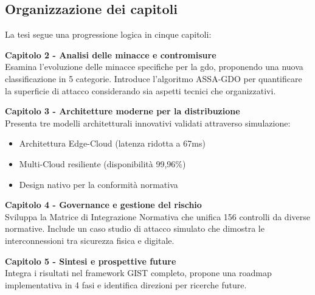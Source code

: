 \subsection{Organizzazione dei capitoli}
\label{subsec:organizzazione}

La tesi segue una progressione logica in cinque capitoli:

\textbf{Capitolo 2 - Analisi delle minacce e contromisure}\\
Esamina l'evoluzione delle minacce specifiche per la \gls{gdo}, proponendo una nuova classificazione in 5 categorie. Introduce l'algoritmo ASSA-GDO per quantificare la superficie di attacco considerando sia aspetti tecnici che organizzativi.

\textbf{Capitolo 3 - Architetture moderne per la distribuzione}\\
Presenta tre modelli architetturali innovativi validati attraverso simulazione:
\begin{itemize}
\item Architettura Edge-Cloud (latenza ridotta a 67ms)
\item Multi-Cloud resiliente (disponibilità 99,96\%)
\item Design nativo per la conformità normativa
\end{itemize}

\textbf{Capitolo 4 - Governance e gestione del rischio}\\
Sviluppa la Matrice di Integrazione Normativa che unifica 156 controlli da diverse normative. Include un caso studio di attacco simulato che dimostra le interconnessioni tra sicurezza fisica e digitale.

\textbf{Capitolo 5 - Sintesi e prospettive future}\\
Integra i risultati nel framework GIST completo, propone una roadmap implementativa in 4 fasi e identifica direzioni per ricerche future.

